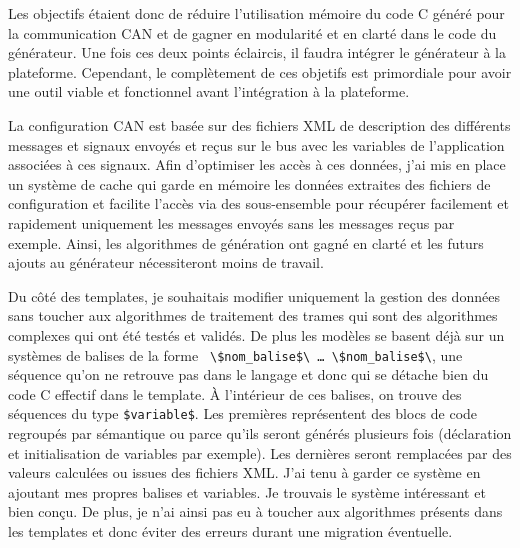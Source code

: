 Les objectifs étaient donc de réduire l'utilisation mémoire du code C
généré pour la communication CAN et de gagner en modularité et en clarté dans le
code du générateur. Une fois ces deux points éclaircis, il faudra intégrer le
générateur à la plateforme. Cependant, le complètement de ces objetifs est
primordiale pour avoir une outil viable et fonctionnel avant l'intégration à la
plateforme.

La configuration CAN est basée sur des fichiers XML de description des
différents messages et signaux envoyés et reçus sur le bus avec les variables
de l'application associées à ces signaux. Afin d'optimiser les accès à ces
données, j'ai mis en place un système de cache qui garde en mémoire les données
extraites des fichiers de configuration et facilite l'accès via des
sous-ensemble pour récupérer facilement et rapidement uniquement les messages
envoyés sans les messages reçus par exemple. Ainsi, les algorithmes de
génération ont gagné en clarté et les futurs ajouts au générateur nécessiteront
moins de travail.

Du côté des templates, je souhaitais modifier uniquement la gestion des données
sans toucher aux algorithmes de traitement des trames qui sont des algorithmes
complexes qui ont été testés et validés. De plus les modèles se basent déjà sur
un systèmes de balises de la forme {\tt
\textbackslash\$nom\_balise\$\textbackslash\- \ldots\-
\textbackslash\$nom\_balise\$\textbackslash}, une séquence qu'on ne retrouve pas
dans le langage et donc qui se détache bien du code C effectif dans le template.
À l'intérieur de ces balises, on trouve des séquences du type {\tt \$variable\$}.
Les premières représentent des blocs de code regroupés par sémantique ou parce
qu'ils seront générés plusieurs fois (déclaration et initialisation de variables
par exemple). Les dernières seront remplacées par des valeurs calculées ou
issues des fichiers XML. J'ai tenu à garder ce système en ajoutant mes propres
balises et variables. Je trouvais le système intéressant et bien conçu. De plus,
je n'ai ainsi pas eu à toucher aux algorithmes présents dans les templates et
donc éviter des erreurs durant une migration éventuelle.

